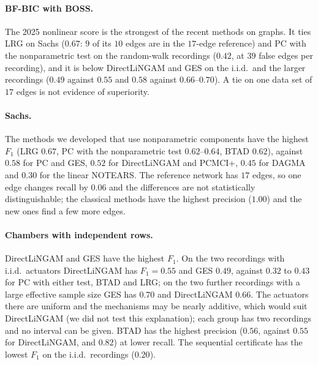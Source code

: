 \paragraph{BF-BIC with BOSS.} The 2025 nonlinear score is the strongest of the recent methods on graphs. It
ties LRG on Sachs ($0.67$: $9$ of its $10$ edges are in the $17$-edge reference) and PC with the nonparametric test on the
random-walk recordings ($0.42$, at $39$ false edges per recording), and it is below DirectLiNGAM and GES on the i.i.d.\ and the larger recordings ($0.49$ against $0.55$ and $0.58$ against $0.66$--$0.70$). A tie on
one data set of $17$ edges is not evidence of superiority.

\paragraph{Sachs.} The methods we developed that use nonparametric components have the
highest $F_1$ (LRG $0.67$, PC with the nonparametric test $0.62$--$0.64$, BTAD $0.62$), against $0.58$
for PC and GES, $0.52$ for DirectLiNGAM and PCMCI+, $0.45$ for DAGMA and $0.30$ for the linear NOTEARS. The reference network
has $17$ edges, so one edge changes recall by $0.06$ and the differences are not statistically
distinguishable; the classical methods have the highest precision ($1.00$) and the new ones
find a few more edges.

\paragraph{Chambers with independent rows.} DirectLiNGAM and GES have the highest $F_1$. On the two
recordings with i.i.d.\ actuators DirectLiNGAM has $F_1=0.55$ and GES $0.49$, against
$0.32$ to $0.43$ for PC with either test, BTAD and LRG; on the two further recordings with
a large effective sample size GES has $0.70$ and DirectLiNGAM $0.66$. The actuators there
are uniform and the mechanisms may be nearly additive, which would suit DirectLiNGAM (we did not test
this explanation); each group has two recordings and no interval can be given. BTAD has the highest
precision ($0.56$, against $0.55$ for DirectLiNGAM, and $0.82$) at lower recall. The sequential
certificate has the lowest $F_1$ on the i.i.d.\ recordings ($0.20$).

